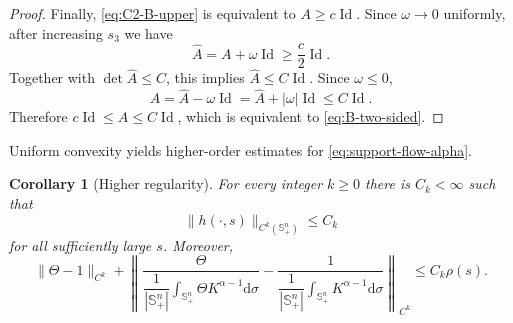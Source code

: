 \documentclass[11pt, reqno]{amsart}
\newtheorem{corollary}[theorem]{Corollary}
\theoremstyle{remark}
\theoremstyle{definition}
\numberwithin{equation}{section}
\newcommand{\Id}{\operatorname{Id}}
\newcommand{\Sph}{\mathbb S}
\begin{document}
\begin{proof}
Finally, \eqref{eq:C2-B-upper} is equivalent to $A\ge c\Id$.  Since
$\omega\to0$ uniformly, after increasing $s_3$ we have
\begin{equation*}
        \widehat A=A+\omega\Id\ge\frac c2\Id.
\end{equation*}
Together with $\det\widehat A\le C$, this implies
$\widehat A\le C\Id$.  Since $\omega\le0$,
\begin{equation*}
        A=\widehat A-\omega\Id
          =\widehat A+|\omega|\Id\le C\Id.
\end{equation*}
Therefore $c\Id\le A\le C\Id$, which is equivalent to
\eqref{eq:B-two-sided}.
\end{proof}




    



Uniform convexity yields higher-order estimates for \eqref{eq:support-flow-alpha}.
\begin{corollary}[Higher regularity]\label{cor:higher-regularity-alpha}
For every integer $k\ge0$ there is $C_k<\infty$ such that
\begin{equation}\label{eq:Ck-alpha}
        \|h(\cdot,s)\|_{C^k(\Sph^n_+)}\le C_k
\end{equation}
for all sufficiently large $s$.
Moreover,
\begin{equation}\label{eq:coefficient-Ck-limit}
        \|\Theta-1\|_{C^k}
        +\left\|\dfrac{\Theta }{\dfrac{1}{|\mathbb{S}_+^n|}\displaystyle\int_{\mathbb{S}_+^n}\Theta K^{\alpha-1}\mathrm{d}\sigma}-\dfrac{1 }{\dfrac{1}{|\mathbb{S}_+^n|}\displaystyle\int_{\mathbb{S}_+^n} K^{\alpha-1}\mathrm{d}\sigma}
        \right\|_{C^k}
        \le C_k\rho(s).
\end{equation}
\end{corollary}
\end{document}
